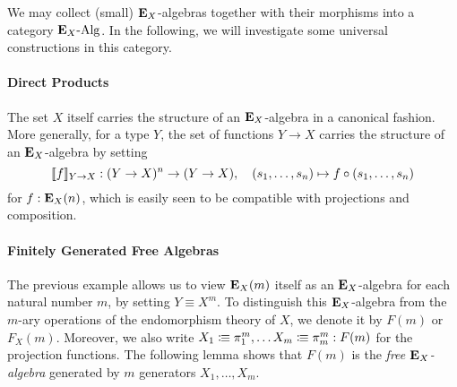 {We may collect (small) \(\mathbf{E}_X\)-algebras together with their morphisms into a category \(\mathbf{E}_X\text{-}\mathrm{Alg}\).
In the following, we will investigate some universal constructions in this category.

\paragraph{Direct Products}
\begin{example}
  The set \(X\) itself carries the structure of an \(\mathbf{E}_X\)-algebra in a canonical fashion.
  More generally, for a type \(Y\), the set of functions \(Y \to X\) carries the structure of an \(\mathbf{E}_X\)-algebra by setting
  \[\llbracket f\rrbracket_{Y\to X} : (Y\to X)^n \to (Y\to X), \quad (s_1,\dots,s_n) \mapsto f\circ (s_1,\dots,s_n)\]
  for \(f:\mathbf{E}_X(n)\), which is easily seen to be compatible with projections and composition.
\end{example}

\paragraph{Finitely Generated Free Algebras}
The previous example allows us to view \(\mathbf{E}_X(m)\) itself as an \(\mathbf{E}_X\)-algebra for each natural number \(m\), by setting \(Y\equiv X^m\).
To distinguish this \(\mathbf{E}_X\)-algebra from the \(m\)-ary operations of the endomorphism theory of \(X\), we denote it by \(F(m)\) or \(F_X(m)\).
Moreover, we also write \(X_1\vcentcolon\mspace{-1.2mu}\equiv \pi^m_1, \dots X_m\vcentcolon\mspace{-1.2mu}\equiv\pi^m_m : F(m)\) for the projection functions.
The following lemma shows that \(F(m)\) is the \emph{free \(\mathbf{E}_X\)-algebra} generated by \(m\) generators \(X_1,\dots,X_m\).

}
